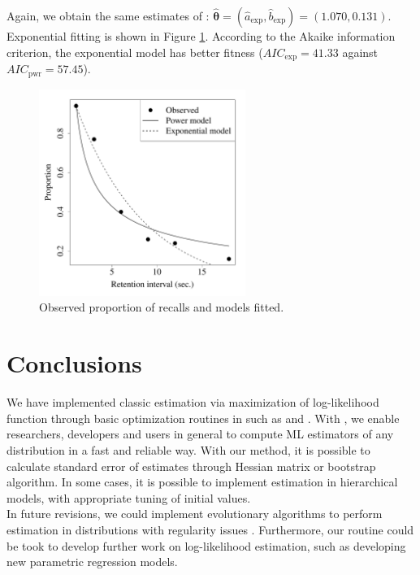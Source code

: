 \documentclass[nojss]{jss}
\begin{document}
Again, we obtain the same estimates of \cite{Myung2003}: $\hat{\boldsymbol{\theta}}=(\hat{a}_{\text{exp}},\hat{b}_{\text{exp}})=(1.070,0.131)$. Exponential fitting is shown in Figure \ref{fig:forgetting}. According to the Akaike information criterion, the exponential model has better fitness ($AIC_{\text{exp}}=41.33$ against $AIC_{\text{pwr}}=57.45$).


\begin{figure}[H]
\centering
  \includegraphics[width=0.6\textwidth]{article-RetentionPlot}
  \caption{\label{fig:forgetting} Observed proportion of recalls and models fitted.}
\end{figure}


\section{Conclusions} \label{sec:conclussions}

We have implemented classic estimation via maximization of log-likelihood function through basic optimization routines in  such as  and . With , we enable researchers, developers and users in general to compute ML estimators of any distribution in a fast and reliable way. With our  method, it is possible to calculate standard error of estimates through Hessian matrix or bootstrap algorithm. In some cases, it is possible to implement estimation in hierarchical models, with appropriate tuning of initial values. \\

In future revisions, we could implement evolutionary algorithms to perform estimation in distributions with regularity issues \citep{Haupt2003}. Furthermore, our routine could be took to develop further work on log-likelihood estimation, such as developing new parametric regression models.



\end{document}
